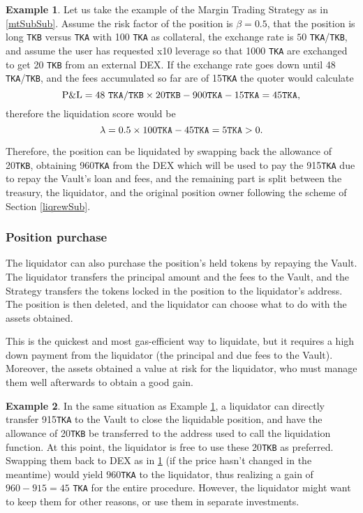 \documentclass[a4paper,10 pt]{article}
\theoremstyle{definition}
\newtheorem{example}{Example}
\begin{document}
\begin{example}\label{mtLiqEx1}
Let us take the example of the Margin Trading Strategy as in \ref{mtSubSub}. Assume the risk factor of the position is $\beta = 0.5$, that the position is long \verb|TKB| versus \verb|TKA| with 100 \verb|TKA| as collateral, the exchange rate is $50$ \verb|TKA|/\verb|TKB|, and assume the user has requested x10 leverage so that 1000 \verb|TKA| are exchanged to get 20 \verb|TKB| from an external DEX. If the exchange rate goes down until 48 \verb|TKA|/\verb|TKB|, and the fees accumulated so far are of 15\verb|TKA| the quoter would calculate $$\text{P\&L} =  48\ \verb|TKA|/\verb|TKB| \times 20  \verb|TKB| -  900 \verb|TKA| - 15\verb|TKA|= 45  \verb|TKA|,$$ therefore the liquidation score would be $$\lambda = 0.5 \times 100\verb|TKA| - 45 \verb|TKA| = 5  \verb|TKA| > 0.$$ 

Therefore, the position can be liquidated by swapping back the allowance of 20\verb|TKB|, obtaining 960\verb|TKA| from the DEX which will be used to pay the 915\verb|TKA| due to repay the Vault's loan and fees, and the remaining part is split between the treasury, the liquidator, and the original position owner following the scheme of Section \ref{liqrewSub}.
\end{example}

\subsubsection{Position purchase}\label{ppSubSub}
The liquidator can also purchase the position's held tokens by repaying the Vault. The liquidator transfers the principal amount and the fees to the Vault, and the Strategy transfers the tokens locked in the position to the liquidator's address. The position is then deleted, and the liquidator can choose what to do with the assets obtained.

 This is the quickest and most gas-efficient way to liquidate, but it requires a high down payment from the liquidator (the principal and due fees to the Vault). Moreover, the assets obtained a value at risk for the liquidator, who must manage them well afterwards to obtain a good gain.

\begin{example}\label{mtLiqEx2}
In the same situation as Example \ref{mtLiqEx1}, a liquidator can directly transfer 915\verb|TKA| to the Vault to close the liquidable position, and have the allowance of 20\verb|TKB| be transferred to the address used to call the liquidation function. At this point, the liquidator is free to use these 20\verb|TKB| as preferred. Swapping them back to DEX as in \ref{mtLiqEx1} (if the price hasn't changed in the meantime) would yield $960$\verb|TKA| to the liquidator, thus realizing a gain of $960-915 = 45$ \verb|TKA| for the entire procedure. However, the liquidator might want to keep them for other reasons, or use them in separate investments. 
\end{example}
\end{document}
